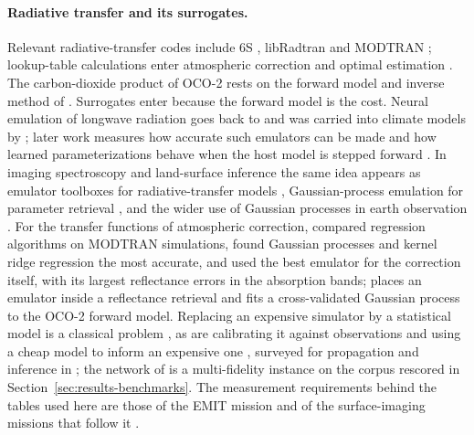 \documentclass[11pt]{article}
\newcommand{\1}{\mathbf{1}}
\begin{document}
\paragraph{Radiative transfer and its surrogates.}
Relevant radiative-transfer codes include 6S \cite{vermote}, libRadtran \cite{mayer,emde}
and MODTRAN \cite{modtran}; lookup-table calculations enter atmospheric correction
\cite{isofit} and optimal estimation \cite{rodgers}. The carbon-dioxide product of
OCO-2 \cite{eldering,crisp} rests on the forward model and inverse method of \cite{connor,odell}.
Surrogates enter because the forward model is the cost. Neural emulation of longwave radiation
goes back to \cite{chevallier} and was carried into climate models by \cite{krasnopolsky}; later
work measures how accurate such emulators can be made \cite{veerman,ukkonen} and how learned
parameterizations behave when the host model is stepped forward \cite{rasp,brenowitz}. In imaging
spectroscopy and land-surface inference the same idea appears as emulator toolboxes for
radiative-transfer models \cite{rivera,verrelst}, Gaussian-process emulation for parameter
retrieval \cite{gomezdans}, and the wider use of Gaussian processes in earth observation
\cite{campsvalls}. For the transfer functions of atmospheric correction, \cite{vicentmodtran}
compared regression algorithms on MODTRAN simulations, found Gaussian processes and kernel ridge
regression the most accurate, and used the best emulator for the correction itself, with its
largest reflectance errors in the absorption bands; \cite{srtmnet} places an emulator inside a
reflectance retrieval and \cite{lamminpaa} fits a cross-validated Gaussian process to the OCO-2
forward model. Replacing an
expensive simulator by a statistical model is a classical problem \cite{sacks}, as are calibrating
it against observations \cite{kennedycalib} and using a cheap model to inform an expensive one
\cite{kennedyohagan,perdikaris}, surveyed for
propagation and inference in \cite{peherstorfer}; the network of \cite{pkan} is a multi-fidelity
instance on the corpus rescored in Section~\ref{sec:results-benchmarks}. The measurement
requirements behind the tables used here are those of the EMIT mission \cite{green} and of the
surface-imaging missions that follow it \cite{cawse}.
\end{document}
